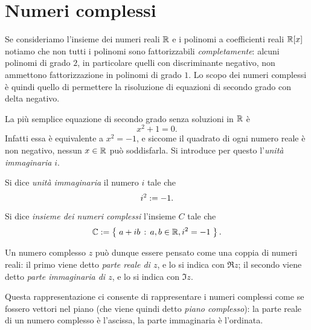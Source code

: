 \section{Numeri complessi}

Se consideriamo l'insieme dei numeri reali $\mathbb{R}$ e i polinomi a coefficienti reali $\mathbb{R}[x]$ notiamo che non tutti i polinomi sono fattorizzabili \emph{completamente}: alcuni polinomi di grado $2$, in particolare quelli con discriminante negativo, non ammettono fattorizzazione in polinomi di grado $1$. Lo scopo dei numeri complessi è quindi quello di permettere la risoluzione di equazioni di secondo grado con delta negativo.

La più semplice equazione di secondo grado senza soluzioni in $\mathbb{R}$ è \[
    x^2 + 1 = 0.  
\] Infatti essa è equivalente a $x^2 = -1$, e siccome il quadrato di ogni numero reale è non negativo, nessun $x \in \mathbb{R}$ può soddisfarla. Si introduce per questo l'\emph{unità immaginaria} $i$.

\begin{definition}
     \label{def:immaginary_unit}
    Si dice \emph{unità immaginaria} il numero $i$ tale che \begin{equation}
        i^2 := -1.
    \end{equation}
\end{definition}

\begin{definition}
    Si dice \emph{insieme dei numeri complessi} l'insieme $C$ tale che \begin{equation}
        \mathbb{C} := \left\{\;a + ib \,:\, a, b \in \mathbb{R}, i^2 = -1\;\right\}.
    \end{equation}
\end{definition}

Un numero complesso $z$ può dunque essere pensato come una coppia di numeri reali: il primo viene detto \emph{parte reale di $z$}, e lo si indica con $\Re z$; il secondo viene detto \emph{parte immaginaria di $z$}, e lo si indica con $\Im z$.

Questa rappresentazione ci consente di rappresentare i numeri complessi come se fossero vettori nel piano (che viene quindi detto \emph{piano complesso}): la parte reale di un numero complesso è l'ascissa, la parte immaginaria è l'ordinata.

\begin{center}\end{center}

